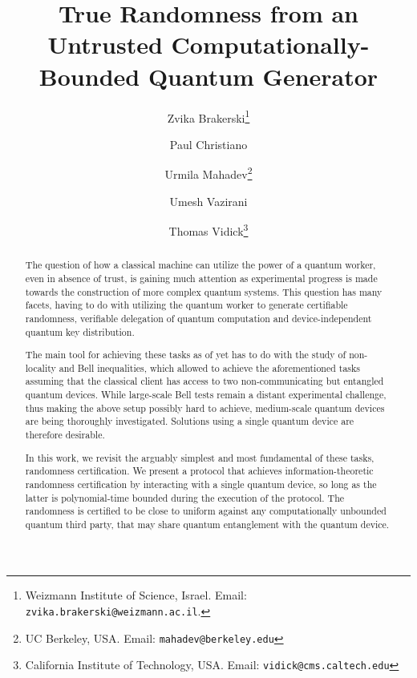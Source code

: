 \documentclass[11pt]{article}
\theoremstyle{remark}
\theoremstyle{definition}
\begin{document}
\title{True Randomness from an Untrusted Computationally-Bounded Quantum Generator}
\author{Zvika Brakerski\thanks{Weizmann Institute of Science, Israel. Email: \texttt{zvika.brakerski@weizmann.ac.il}.} \and Paul Christiano \and Urmila Mahadev\thanks{UC Berkeley, USA. Email: \texttt{mahadev@berkeley.edu}} \and Umesh Vazirani \and Thomas Vidick\thanks{California Institute of Technology, USA. Email: \texttt{vidick@cms.caltech.edu}}}
\date{}
\maketitle

\noteswarning

\begin{abstract}

The question of how a classical machine can utilize the power of a quantum worker, even in absence of trust, is gaining much attention as experimental progress is made towards the construction of more complex quantum systems. This question has many facets, having to do with utilizing the quantum worker to generate certifiable randomness, verifiable delegation of quantum computation and device-independent quantum key distribution.

The main tool for achieving these tasks as of yet has to do with the study of non-locality and Bell inequalities, which allowed to achieve the aforementioned tasks assuming that the classical client has access to two non-communicating but entangled quantum devices. While large-scale Bell tests remain a distant experimental challenge, thus making the above setup possibly hard to achieve, medium-scale quantum devices are being thoroughly investigated. Solutions using a single quantum device are therefore desirable.

In this work, we revisit the arguably simplest and most fundamental of these tasks, randomness certification. We present a protocol that achieves information-theoretic randomness certification by interacting with a single quantum device, so long as the latter is polynomial-time bounded during the execution of the protocol. The randomness is certified to be close to uniform against any computationally unbounded quantum third party, that may share quantum entanglement with the quantum device.


\end{abstract}
\end{document}
